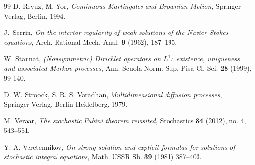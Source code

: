 \documentclass[a4paper,10pt]{article}
\begin{document}
\begin{thebibliography}{99}
D. Revuz, M. Yor, \textit{Continuous Martingales and
Brownian Motion}, Springer-Verlag, Berlin, 1994.

J.~Serrin, \textit{On the interior regularity of weak solutions of the
  {N}avier-{S}tokes equations}, Arch. Rational Mech. Anal. \textbf{{\bf9}}
  (1962), 187--195.

W. Stannat, \textit{(Nonsymmetric) Dirichlet operators on $L^{1}$:\ existence, 
uniqueness and associated Markov processes}, Ann. Scuola
Norm. Sup. Pisa Cl. Sci. \textbf{28} (1999), 99-140.

 D. W. Stroock, S. R. S. Varadhan, \textit{Multidimensional diffusion processes}, Springer-Verlag, Berlin Heidelberg, 1979.

M. Veraar, \textit{The stochastic Fubini theorem revisited}, Stochastics \textbf{84} (2012), no. 4, 543--551.

Y. A. Veretennikov, \textit{On strong solution and explicit formulas for solutions of stochastic integral equations}, Math. USSR Sb. \textbf{39} (1981) 387--403.

\end{thebibliography}
\end{document}
